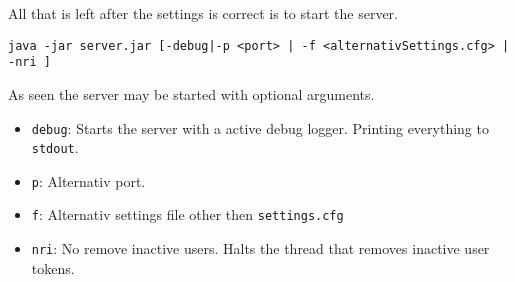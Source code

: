 All that is left after the settings is correct is to start the server.

\begin{verbatim}
java -jar server.jar [-debug|-p <port> | -f <alternativSettings.cfg> | -nri ]
\end{verbatim}
As seen the server may be started with optional arguments.
\begin{itemize}
	\item \texttt{debug}: Starts the server with a active debug logger. Printing everything to \texttt{stdout}.
	\item \texttt{p}: Alternativ port.
	\item \texttt{f}: Alternativ settings file other then \texttt{settings.cfg}
	\item \texttt{nri}: No remove inactive users. Halts the thread that removes inactive user tokens.
\end{itemize}
